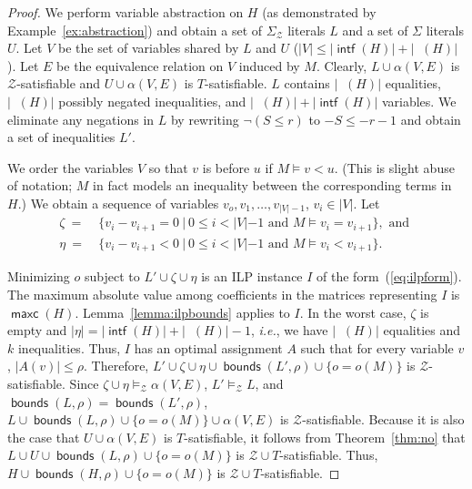\documentclass{llncs}
\newcommand{\ie}[0]{\emph{i.e.}, }
\newcommand{\Z}[0]{\ensuremath{\mathcal{Z}}}
\newcommand{\ZT}[0]{\ensuremath{\mathcal{Z} \cup T}}
\newcommand{\SigmaZ}[0]{\ensuremath{\Sigma_{\mathcal{Z}}}}
\newcommand{\modelsz}[0]{\ensuremath{ \models_{\Z} }}
\DeclareMathOperator{\intf}{\mathsf{intf}}
\DeclareMathOperator{\intfz}{\mathsf{intf}_{\Z}}
\DeclareMathOperator{\maxc}{\mathsf{maxc}}
\DeclareMathOperator{\zatoms}{\mathsf{atoms_{\Z}}}
\DeclareMathOperator{\bounds}{\mathsf{bounds}}
\DeclareMathOperator{\zvars}{\mathsf{vars_{\Z}}}
\begin{document}
\begin{proof}
  We perform variable abstraction on $H$ (as demonstrated by
  Example~\ref{ex:abstraction}) and obtain a set of \SigmaZ{} literals
  $L$ and a set of $\Sigma$ literals $U$.  Let $V$ be the set of
  variables shared by $L$ and $U$ ($|V| \leq |\intf(H)| +
  |\zvars(H)|$). Let $E$ be the equivalence relation on $V$ induced by
  $M$. Clearly, $L \cup \alpha(V, E)$ is \Z{}-satisfiable and $U \cup
  \alpha(V, E)$ is $T$-satisfiable.  $L$ contains $|\intfz(H)|$
  equalities, $|\zatoms(H)|$ possibly negated inequalities, and
  $|\zvars(H)| + |\intf(H)|$ variables. We eliminate any negations in
  $L$ by rewriting $\neg (S \leq r)$ to $- S \leq - r - 1$ and obtain
  a set of inequalities $L'$.

  We order the variables $V$ so that $v$ is before $u$ if $M \models v
  < u$. (This is slight abuse of notation; $M$ in fact models an
  inequality between the corresponding terms in $H$.) We obtain a
  sequence of variables $v_o, v_1, \ldots, v_{|V| - 1}$, $v_i \in
  |V|$. Let
  \begin{align*}
    \zeta~=&~\{ v_i - v_{i+1} = 0~|~0 \leq i < |V| - 1 \text{ and
    } M \models v_i = v_{i+1} \}, \text{ and } \\
    \eta~=&~\{ v_i - v_{i+1} < 0~|~0 \leq i < |V| - 1 \text{ and } M
    \models v_i < v_{i+1} \}.
  \end{align*}

  Minimizing $o$ subject to $L' \cup \zeta \cup \eta$ is an ILP
  instance $I$ of the form~(\ref{eq:ilpform}). The maximum absolute
  value among coefficients in the matrices representing $I$ is
  $\maxc(H)$. Lemma~\ref{lemma:ilpbounds} applies to $I$. In the worst
  case, $\zeta$ is empty and $|\eta| = |\intf(H)| + |\zvars(H)| - 1$,
  \ie we have $|\intfz(H)|$ equalities and $k$ inequalities. Thus, $I$
  has an optimal assignment $A$ such that for every variable $v$,
  $|A(v)| \leq \rho$. Therefore, $L' \cup \zeta \cup \eta \cup
  \bounds(L', \rho) \cup \{o = o(M)\}$ is \Z{}-satisfiable. Since
  $\zeta \cup \eta \modelsz \alpha(V, E)$, $L' \modelsz L$, and
  $\bounds(L, \rho) = \bounds(L', \rho)$, $L \cup \bounds(L, \rho) \cup
  \{o = o(M)\} \cup \alpha(V, E)$ is \Z{}-satisfiable. Because it is
  also the case that $U \cup \alpha(V, E)$ is $T$-satisfiable, it
  follows from Theorem~\ref{thm:no} that $L \cup U \cup \bounds(L,
  \rho) \cup \{o = o(M)\}$ is \ZT{}-satisfiable. Thus, $H \cup
  \bounds(H, \rho) \cup \{o = o(M)\}$ is \ZT{}-satisfiable.
\end{proof}
\end{document}
